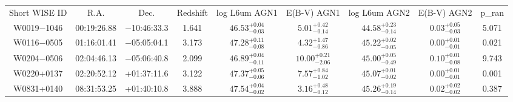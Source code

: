 \begin{table}
\begin{tabular}{ccccccccc}
Short WISE ID & R.A. & Dec. & Redshift & log L6um AGN1 & E(B-V) AGN1 & log L6um AGN2 & E(B-V) AGN2 & p_ran \\
W0019$-$1046 & 00:19:26.88 & $-$10:46:33.3 & 1.641 & $46.53^{+0.04}_{-0.03}$ & $ 5.01^{+0.42}_{-0.14}$ & $44.58^{+0.23}_{-0.14}$ & $ 0.03^{+0.05}_{-0.03}$ & 5.071 \\
W0116$-$0505 & 01:16:01.41 & $-$05:05:04.1 & 3.173 & $47.28^{+0.11}_{-0.08}$ & $ 4.32^{+1.47}_{-0.86}$ & $45.22^{+0.02}_{-0.05}$ & $ 0.00^{+0.01}_{-0.01}$ & 0.021 \\
W0204$-$0506 & 02:04:46.13 & $-$05:06:40.8 & 2.099 & $46.89^{+0.04}_{-0.11}$ & $10.00^{+0.21}_{-2.06}$ & $45.00^{+0.05}_{-0.49}$ & $ 0.10^{+0.01}_{-0.08}$ & 9.743 \\
W0220+0137 & 02:20:52.12 & +01:37:11.6 & 3.122 & $47.37^{+0.05}_{-0.06}$ & $ 7.57^{+0.84}_{-1.02}$ & $45.07^{+0.01}_{-0.02}$ & $ 0.00^{+0.01}_{-0.01}$ & 0.001 \\
W0831+0140 & 08:31:53.25 & +01:40:10.8 & 3.888 & $47.54^{+0.04}_{-0.02}$ & $ 3.16^{+0.48}_{-0.12}$ & $45.26^{+0.19}_{-0.14}$ & $ 0.02^{+0.02}_{-0.02}$ & 0.387 \\
\end{tabular}
\end{table}
